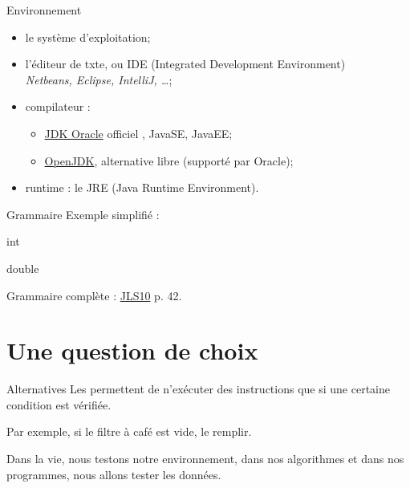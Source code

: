 \begin{hideedit}
\begin{frame}{Environnement}
  \begin{itemize}
    \item le système d'exploitation;
    \item l'éditeur de txte, ou IDE (Integrated Development Environment)\\
      \textit{Netbeans, Eclipse, IntelliJ, \dots};
    \item compilateur :
      \begin{itemize}
        \item 
          \href{http://www.oracle.com/technetwork/java/javase/downloads}
          {JDK Oracle} \og officiel \fg, JavaSE, JavaEE;
        \item \href{http://openjdk.java.net/}{OpenJDK}, alternative libre
          (supporté par Oracle);
      \end{itemize}
    \item runtime : le JRE (Java Runtime Environment).
  \end{itemize}
\end{frame}

\begin{frame}[fragile]{Grammaire}
  Exemple simplifié :
\begin{grammaire}

    int

    double
\end{grammaire}

  Grammaire complète : \href{https://docs.oracle.com/javase/specs/jls/se10/jls10.pdf}{JLS10} p. 42.
\end{frame}

\section{Une question de choix}
\frame{\sectionpage}

\begin{frame}{Alternatives}
  Les  permettent de n’exécuter des
  instructions que si une certaine \alert{condition} est vérifiée.

  Par exemple, si le filtre à café est vide, le remplir.
  
  Dans la vie, nous testons notre environnement, dans nos algorithmes et
  dans nos programmes, nous allons tester les données.
  
\end{frame}


\end{hideedit}
